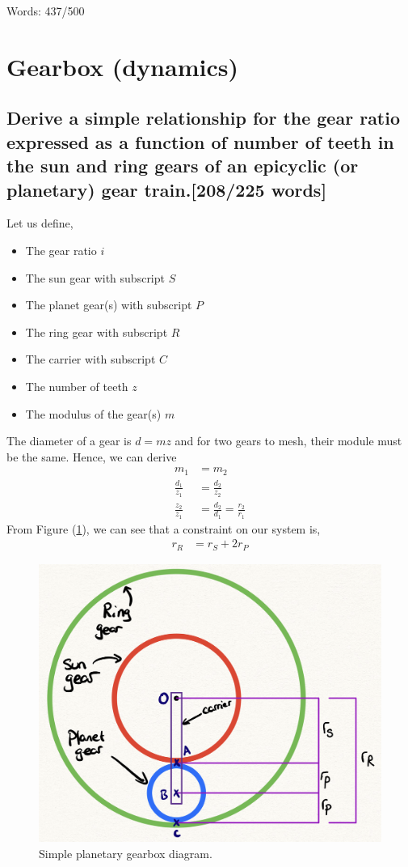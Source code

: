 \documentclass[12pt]{article}
\numberwithin{equation}{section}
\begin{document}
\begin{flushleft}
Words: 437/500

\section{Gearbox (dynamics)}
\subsection[Gear ratio derivation.]{Derive a simple relationship for the gear ratio expressed as a function of number of teeth in the sun and ring gears of an epicyclic (or planetary) gear train.[208/225 words]}
Let us define,
\begin{multicols}{2}
  \begin{itemize} 
    \item The gear ratio $i$
    \item The sun gear with subscript $S$
    \item The planet gear(s) with subscript $P$ 
    \item The ring gear with subscript $R$
    \item The carrier with subscript $C$
    \item The number of teeth $z$
    \item The modulus of the gear(s) $m$
  \end{itemize}
\end{multicols}
The diameter of a gear is $d = mz$ and for two gears to mesh, their module must be the same. Hence, we can derive
\begin{align}
  m_1 &= m_2\\
  \frac{d_1}{z_1} &= \frac{d_2}{z_2}\\
  \frac{z_2}{z_1} &= \frac{d_2}{d_1} = \frac{r_2}{r_1}
\end{align}
From Figure (\ref{SystemRadii}), we can see that a constraint on our system is,
\begin{align}
  r_R &= r_S + 2r_P
  \label{radiiRelationship}
\end{align}
\begin{figure}[H]
  \centering
  \includegraphics[width = 0.7 \textwidth]{./img/GearRadii.png}
  \caption{Simple planetary gearbox diagram.}
  \label{SystemRadii}
\end{figure}


\end{flushleft}
\end{document}

